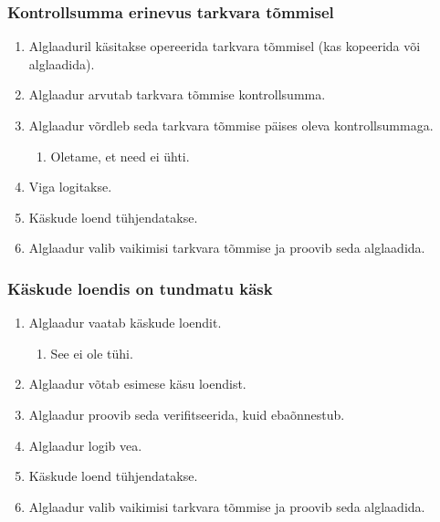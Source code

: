 \documentclass[12pt,a4paper]{article}
\begin{document}
\subsubsection{Kontrollsumma erinevus tarkvara tõmmisel}
\begin{enumerate}
	\item Alglaaduril käsitakse opereerida tarkvara tõmmisel (kas kopeerida või
		alglaadida).
	\item Alglaadur arvutab tarkvara tõmmise kontrollsumma.
	\item Alglaadur võrdleb seda tarkvara tõmmise päises oleva kontrollsummaga.
		\begin{enumerate}
			\item Oletame, et need ei ühti.
		\end{enumerate}
	\item Viga logitakse.
	\item Käskude loend tühjendatakse.
	\item Alglaadur valib vaikimisi tarkvara tõmmise ja proovib seda alglaadida.
\end{enumerate}

\subsubsection{Käskude loendis on tundmatu käsk}
\begin{enumerate}
	\item Alglaadur vaatab käskude loendit.
		\begin{enumerate}
			\item See ei ole tühi.
		\end{enumerate}
	\item Alglaadur võtab esimese käsu loendist.
	\item Alglaadur proovib seda verifitseerida, kuid ebaõnnestub.
	\item Alglaadur logib vea.
	\item Käskude loend tühjendatakse.
	\item Alglaadur valib vaikimisi tarkvara tõmmise ja proovib seda alglaadida.
\end{enumerate}
\end{document}
